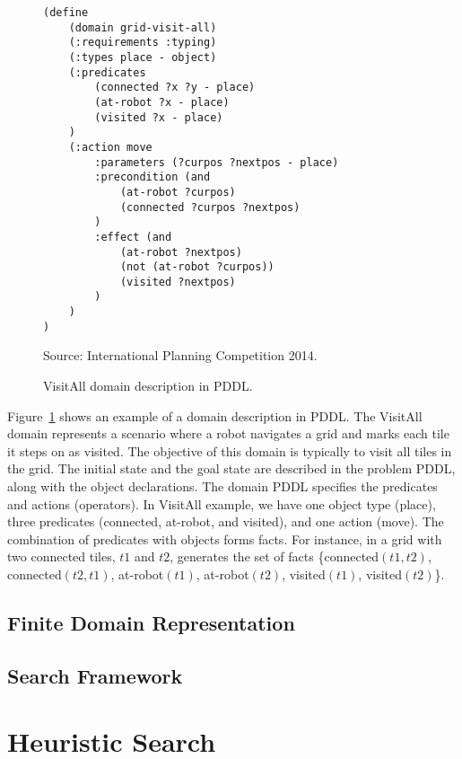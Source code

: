 \begin{figure}[ht]
\caption{VisitAll domain description in PDDL.}
\label{fig:pddl}
\addvspace{\baselineskip}
\centering
\begin{lstlisting}[basicstyle=\ttfamily]
(define
    (domain grid-visit-all)
    (:requirements :typing)
    (:types place - object)
    (:predicates
        (connected ?x ?y - place)
        (at-robot ?x - place)
        (visited ?x - place)
    )
    (:action move
        :parameters (?curpos ?nextpos - place)
        :precondition (and
            (at-robot ?curpos)
            (connected ?curpos ?nextpos)
        )
        :effect (and 
            (at-robot ?nextpos)
            (not (at-robot ?curpos))
            (visited ?nextpos)
        )
    )
)
\end{lstlisting}
Source: International Planning Competition 2014.
\end{figure}

Figure~\ref{fig:pddl} shows an example of a domain description in PDDL. The VisitAll domain represents a scenario where a robot navigates a grid and marks each tile it steps on as visited. The objective of this domain is typically to visit all tiles in the grid. The initial state and the goal state are described in the problem PDDL, along with the object declarations. The domain PDDL specifies the predicates and actions (operators). In VisitAll example, we have one object type (place), three predicates (connected, at-robot, and visited), and one action (move). The combination of predicates with objects forms facts. For instance, in a grid with two connected tiles, $t1$ and $t2$, generates the set of facts \{connected$(t1,t2)$, connected$(t2,t1)$, at-robot$(t1)$, at-robot$(t2)$, visited$(t1)$, visited$(t2)$\}.

\subsection{Finite Domain Representation}
\label{sec:background_sas}


\subsection{Search Framework}
\label{sec:background_searchframework}

\section{Heuristic Search}
\label{sec:background_heuristicsearch}

